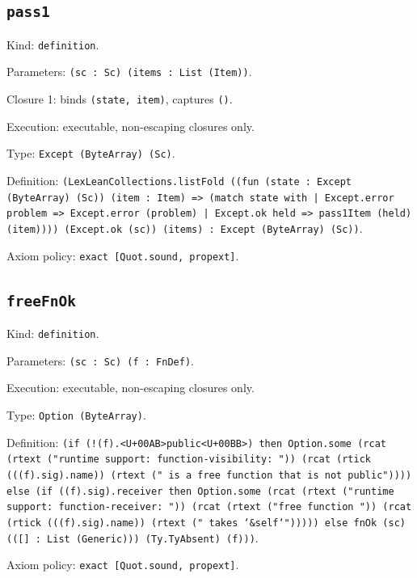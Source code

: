 \documentclass[11pt]{article}
\begin{document}
\subsection*{\texttt{pass1}}
\noindent Kind: \texttt{definition}.\par
\noindent Parameters: \texttt{(sc : Sc) (items : List (Item))}.\par
\noindent Closure 1: binds \texttt{(state, item)}, captures \texttt{()}.\par
\noindent Execution: executable, non-escaping closures only.\par
\noindent Type: \texttt{Except (ByteArray) (Sc)}.\par
\noindent Definition: \texttt{(LexLeanCollections.listFold ((fun (state : Except (ByteArray) (Sc)) (item : Item) => (match state with | Except.error problem => Except.error (problem) | Except.ok held => pass1Item (held) (item)))) (Except.ok (sc)) (items) : Except (ByteArray) (Sc))}.\par
\noindent Axiom policy: \texttt{exact [Quot.sound, propext]}.\par
\subsection*{\texttt{freeFnOk}}
\noindent Kind: \texttt{definition}.\par
\noindent Parameters: \texttt{(sc : Sc) (f : FnDef)}.\par
\noindent Execution: executable, non-escaping closures only.\par
\noindent Type: \texttt{Option (ByteArray)}.\par
\noindent Definition: \texttt{(if (!(f).<U+00AB>public<U+00BB>) then Option.some (rcat (rtext ("runtime support: function-visibility: ")) (rcat (rtick (((f).sig).name)) (rtext (" is a free function that is not public")))) else (if ((f).sig).receiver then Option.some (rcat (rtext ("runtime support: function-receiver: ")) (rcat (rtext ("free function ")) (rcat (rtick (((f).sig).name)) (rtext (" takes `\&self`"))))) else fnOk (sc) (([] : List (Generic))) (Ty.TyAbsent) (f)))}.\par
\noindent Axiom policy: \texttt{exact [Quot.sound, propext]}.\par
\end{document}
